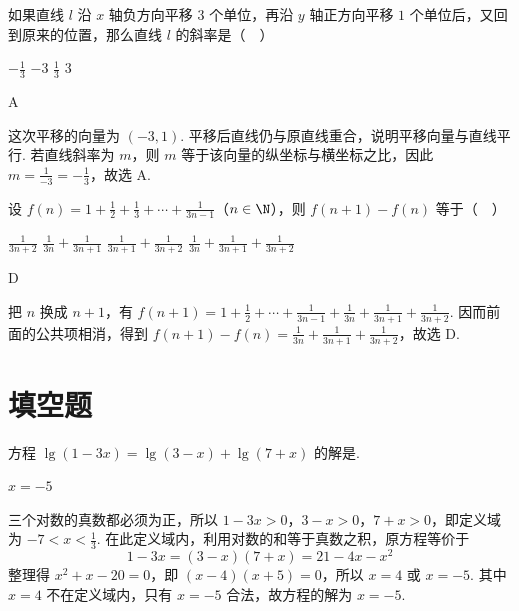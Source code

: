 \documentclass[UTF8,a4paper,oneside,11pt]{ctexbook}
\begin{document}
\begin{problem}
如果直线 \(l\) 沿 \(x\) 轴负方向平移 \(3\) 个单位，再沿 \(y\) 轴正方向平移 \(1\) 个单位后，又回到原来的位置，那么直线 \(l\) 的斜率是（\(\quad\)）

\choices
    {\(-\frac{1}{3}\)}
    {\(-3\)}
    {\(\frac{1}{3}\)}
    {\(3\)}
\end{problem}

\begin{answer}
A
\end{answer}

\begin{solution}
这次平移的向量为 \((-3,1)\). 平移后直线仍与原直线重合，说明平移向量与直线平行. 若直线斜率为 \(m\)，则 \(m\) 等于该向量的纵坐标与横坐标之比，因此 \(m=\frac{1}{-3}=-\frac13\)，故选 A.
\end{solution}

\begin{problem}
设 \(f(n) = 1 + \frac{1}{2} + \frac{1}{3} + \cdots + \frac{1}{3n-1}\)（\(n \in \N\)），则 \(f(n+1) - f(n)\) 等于（\(\quad\)）

\choices
    {\(\frac{1}{3n+2}\)}
    {\(\frac{1}{3n} + \frac{1}{3n + 1}\)}
    {\(\frac{1}{3n + 1} +\frac{1}{3n + 2}\)}
    {\(\frac{1}{3n} + \frac{1}{3n + 1} + \frac{1}{3n + 2}\)}
\end{problem}

\begin{answer}
D
\end{answer}

\begin{solution}
把 \(n\) 换成 \(n+1\)，有 \(f(n+1)=1+\frac12+\cdots+\frac1{3n-1}+\frac1{3n}+\frac1{3n+1}+\frac1{3n+2}\). 因而前面的公共项相消，得到 \(f(n+1)-f(n)=\frac1{3n}+\frac1{3n+1}+\frac1{3n+2}\)，故选 D.
\end{solution}

\section{填空题}

\begin{problem}
方程 \(\lg(1-3x)=\lg(3-x)+\lg(7+x)\) 的解是\fillinblank{}.
\end{problem}

\begin{answer}
\(x=-5\)
\end{answer}

\begin{solution}
三个对数的真数都必须为正，所以 \(1-3x>0\)，\(3-x>0\)，\(7+x>0\)，即定义域为 \(-7<x<\frac13\). 在此定义域内，利用对数的和等于真数之积，原方程等价于
\[
1-3x=(3-x)(7+x)=21-4x-x^2
\]
整理得 \(x^2+x-20=0\)，即 \((x-4)(x+5)=0\)，所以 \(x=4\) 或 \(x=-5\). 其中 \(x=4\) 不在定义域内，只有 \(x=-5\) 合法，故方程的解为 \(x=-5\).
\end{solution}
\end{document}
